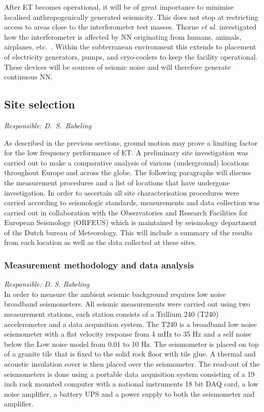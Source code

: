 After ET becomes operational, it will be of great importance to minimise localised anthropogenically generated seismicity. This does not stop at restricting access to areas close to the interferometer test masses. Thorne \emph{et al.} investigated how the interferometer is affected by NN originating from humans, animals, airplanes, etc.~\cite{GGthorneWinstein}. Within the subterranean environment this extends to placement of electricity generators, pumps, and cryo-coolers to keep the facility operational. These devices will be sources of seismic noise and will therefore generate continuous NN. 
\FloatBarrier
\subsection{Site selection}
\emph{
Responsible:  D.\ S.\ Rabeling  \\
}

As described in the previous sections, ground motion may prove a limiting factor for the low frequency performance of ET. A preliminary site investigation was carried out to make a comparative analysis of various (underground) locations throughout Europe and across the globe. The following paragraphs will discuss the measurement procedures and a list of locations that have undergone investigation. In order to ascertain all site characterisation procedures were carried according to seismologic standards, measurements and data collection was carried out in collaboration with the Observatories and Research Facilities for European Seismology (ORFEUS) which is maintained by seismology department of the Dutch bureau of Meteorology. This will include a summary of the results from each location as well as the data collected at these sites. 
\FloatBarrier
\subsubsection{Measurement methodology and data analysis}
\emph{
Responsible:  D. S. Rabeling  \\
}
In order to measure the ambient seismic background requires low noise broadband seismometers. All seismic measurements were carried out using two measurement stations, each station consists of a Trillium 240 (T240) accelerometer and a data acquisition system. The T240 is a broadband low noise seismometer with a flat velocity response from 4 mHz to 35 Hz and a self noise below the Low noise model  from 0.01 to 10 Hz. The seismometer is placed on top of a granite tile that is fixed to the solid rock floor with tile glue. A thermal and acoustic insulation cover is then placed over the seismometer. The read-out of the seismometers is done using a portable data acquisition system consisting of a 19 inch rack mounted computer with a national instruments 18 bit DAQ card, a low noise amplifier, a battery UPS and a power supply to both the seismometer and amplifier. 

